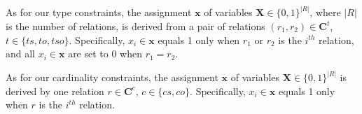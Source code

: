 As for our type constraints, the assignment $\bm x$ of variables $\bm{X}\in \{0,1\}^{|R|}$, where $|R|$ is the number of relations, 
is derived from a pair of relations $(r_1, r_2) \in \bm{C}^{t}$, $t\in\{ts,to,tso\}$.
Specifically, $x_i\in \bm{x}$ equals 1 only when $r_1$ or $r_2$ is the $i^{th}$ relation,
and all $x_i\in \bm{x}$ are set to 0 when $r_1=r_2$.

As for our cardinality constraints, the assignment $\bm x$ of variables $\bm{X}\in \{0,1\}^{|R|}$ is derived by one relation $r \in \bm{C}^{c}$, $c\in\{cs,co\}$. 
Specifically, $x_i\in \bm{x}$ equals 1 only when $r$ is the $i^{th}$ relation.

\iffalse



